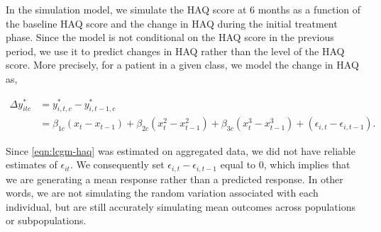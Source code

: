 \documentclass[11pt,final,fleqn]{article}\usepackage[]{graphicx}\usepackage[]{color}
\theoremstyle{plain}
\begin{document}
\begin{appendices}
In the simulation model, we simulate the HAQ score at 6 months as a function of the baseline HAQ score and the change in HAQ during the initial treatment phase. Since the \citet{norton2014health} model is not conditional on the HAQ score in the previous period, we use it to predict changes in HAQ rather than the level of the HAQ score. More precisely, for a patient in a given class, we model the change in HAQ as,  

\begin{align}\label{eqn:lcgm-dhaq}
\Delta y_{itc}^{*} &= y_{i,t,c}^{*} - y_{i,t-1,c}^{*} \\
&= \beta_{1c}(x_t - x_{t-1}) + \beta_{2c}(x_t^2 - x_{t-1}^2) + \beta_{3c}(x_t^3-x_{t-1}^3) + (\epsilon_{i,t} - \epsilon_{i,t-1}). \nonumber
\end{align}

Since \autoref{eqn:lcgm-haq} was estimated on aggregated data, we did not have reliable estimates of $\epsilon_{it}$. We consequently set $\epsilon_{i,t} - \epsilon_{i,t-1}$ equal to 0, which implies that we are generating a mean response rather than a predicted response. In other words, we are not simulating the random variation associated with each individual, but are still accurately simulating mean outcomes across populations or subpopulations. 


\end{appendices}
\end{document}

